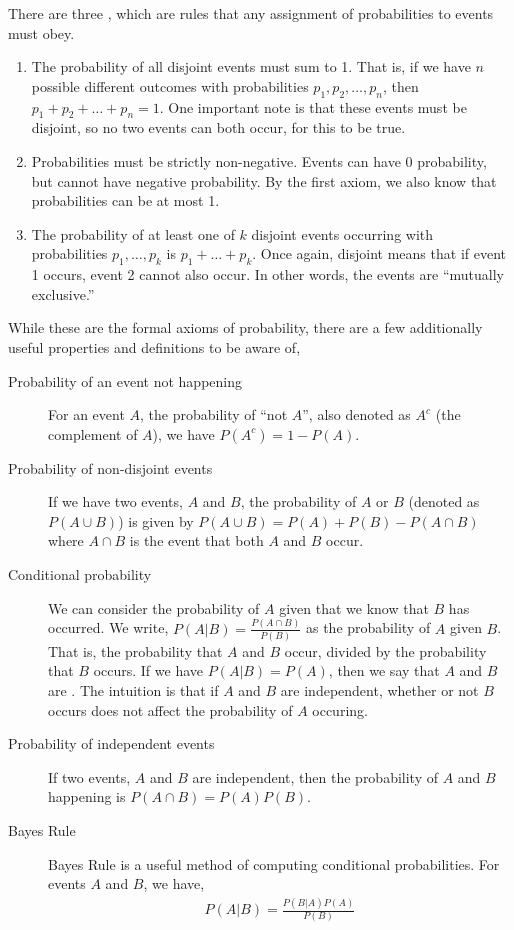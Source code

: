 There are three , which are rules that any assignment of probabilities to events must obey.

\begin{enumerate}
    \item The probability of all disjoint events must sum to 1. That is, if we have $n$ possible different outcomes with probabilities $p_1, p_2, \dots, p_n$, then $p_1 + p_2 + \dots + p_n = 1$. One important note is that these events must be disjoint, so no two events can both occur, for this to be true.
    \item Probabilities must be strictly non-negative. Events can have $0$ probability, but cannot have negative probability. By the first axiom, we also know that probabilities can be at most 1.
    \item The probability of at least one of $k$ disjoint events occurring with probabilities $p_1, \dots, p_k$ is $p_1 + \dots + p_k$. Once again, disjoint means that if event 1 occurs, event 2 cannot also occur. In other words, the events are ``mutually exclusive.''
\end{enumerate}

While these are the formal axioms of probability, there are a few additionally useful properties and definitions to be aware of,
\begin{description}
    \item[Probability of an event not happening] For an event $A$, the probability of ``not $A$'', also denoted as $A^c$ (the complement of $A$), we have $P(A^c) = 1 - P(A)$.
    \item[Probability of non-disjoint events] If we have two events, $A$ and $B$, the probability of $A$ or $B$ (denoted as $P(A \cup B)$) is given by $P(A \cup B) = P(A) + P(B) - P(A \cap B)$ where $A \cap B$ is the event that both $A$ and $B$ occur.  
    \item[Conditional probability] We can consider the probability of $A$ given that we know that $B$ has occurred. We write, $P(A | B) = \frac{P(A \cap B)}{P(B)}$ as the probability of $A$ given $B$. That is, the probability that $A$ and $B$ occur, divided by the probability that $B$ occurs. If we have $P(A | B) = P(A)$, then we say that $A$ and $B$ are . The intuition is that if $A$ and $B$ are independent, whether or not $B$ occurs does not affect the probability of $A$ occuring. 
    \item[Probability of independent events] If two events, $A$ and $B$ are independent, then the probability of $A$ and $B$ happening is $P(A \cap B) = P(A) P(B)$. 
    \item[Bayes Rule] Bayes Rule is a useful method of computing conditional probabilities. For events $A$ and $B$, we have,
    \begin{align*}
        P(A | B) = \frac{P(B | A) P(A)}{P(B)}
    \end{align*}  
\end{description}

